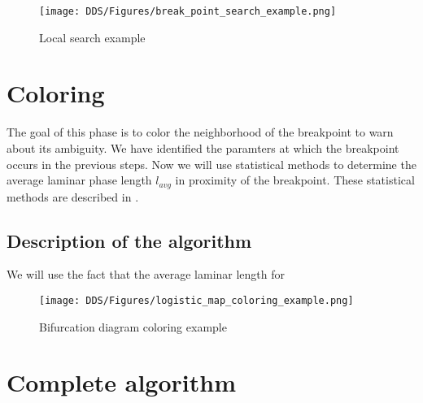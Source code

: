 \begin{figure}[!h]
    \centering
    \texttt{[image: DDS/Figures/break\_point\_search\_example.png]}
    \caption{Local search example}
    \label{fig:break_point_search_example}
\end{figure}


\section{Coloring}
The goal of this phase is to color the neighborhood of the breakpoint to warn about its ambiguity.
We have identified the paramters at which the breakpoint occurs in the previous steps.
Now we will use statistical methods to determine the average laminar phase length $l_{avg}$ in proximity of the breakpoint.
These statistical methods are described in \cite{Elaskar2022}.

\subsection{Description of the algorithm}
We will use the fact that the average laminar length for 

\begin{figure}[!h]
    \centering
    \texttt{[image: DDS/Figures/logistic\_map\_coloring\_example.png]}
    \caption{Bifurcation diagram coloring example}
    \label{fig:coloring_example}
\end{figure}

\section{Complete algorithm}

\endinput